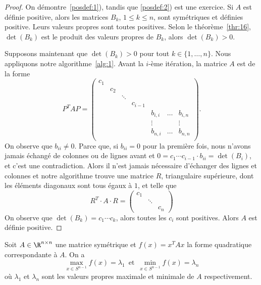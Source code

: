 \begin{proof}

On démontre~\ref{posdef:1}), tandis que \ref{posdef:2}) est une exercice. 
Si $A$ est définie positive, alors 
les matrices $B_k$, $ 1 \leq k \leq n$,  sont symétriques  et définies positive. Leurs valeurs propres sont toutes positives.  Selon le théorème~\ref{thr:16}, $\det(B_k)$ est le produit des valeurs propres de $B_k$, alors $\det(B_k)>0$. 


Supposons maintenant que $\det(B_k)>0$ pour tout $k \in \{1,\dots,n\}$. Nous appliquons notre algorithme~\ref{alg:1}. Avant la $i$-ème itération, la matrice $A$ est de la forme 
\begin{displaymath}
  P^T A P = \begin{pmatrix}
      c_1 \\
      & c_2 \\
      & & \ddots & &&\\
      & & & c_{i-1} \\
      & & & &  b_{i,i} & \dots & b_{i,n} \\
      & & & &     \vdots       &  & \vdots \\
      & & & &  b_{n,i} & \dots & b_{n,n} \\      
    \end{pmatrix}. 
\end{displaymath} 
 On observe que $b_{ii} \neq 0$. Parce que, si $b_{ii} = 0$ pour la première fois, nous n'avons jamais échangé de colonnes ou de lignes avant et  $ 0 = c_1\cdots c_{i-1} \cdot b_{ii} = \det(B_i)$, et c'est une contradiction.  
 Alors il n'est jamais nécessaire d'échanger des lignes et colonnes et notre algorithme trouve une matrice $R$, triangulaire supérieure, dont les éléments diagonaux sont tous égaux à $1$, et telle que 
\begin{displaymath}
  R^T \cdot A \cdot R =  
\begin{pmatrix}
      c_1 \\
             & \ddots & \\
       & & c_{n}
    \end{pmatrix}
\end{displaymath}
On observe que $\det(B_k) = c_1\cdots c_k$, alors toutes les $c_i$ sont positives. Alors $A$ est définie positive. 
\end{proof}


\begin{theorem}
  \label{thr:18}
  Soit $A \in \R^{n\times n}$ une matrice symétrique et $f(x) = x^TAx$ la forme quadratique correspondante à $A$. On a
  \begin{equation}
    \label{eq:11}
    \max_{x \in S^{n-1}} f(x) = \lambda_1  \, \text{ et } \,  \min_{x \in S^{n-1}} f(x)  = \lambda_n
  \end{equation}
  où $\lambda_1$ et $\lambda_n$ sont les valeurs propres maximale et minimale de $A$ respectivement. 
\end{theorem}

